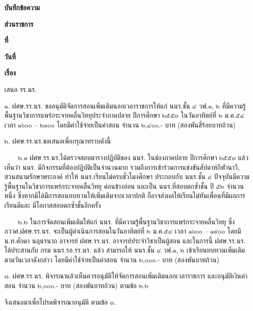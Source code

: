 \documentclass[a4paper, oneside]{article}
\begin{document}
	\begin{center}
		\begin{huge}
			\textbf{บันทึกข้อความ}
		\end{huge}	
	\end{center}
	\begin{large}
		\textbf{ส่วนราชการ}
	\end{large}
	\underline{}
	\newline
	\begin{large}
		\textbf{ที่}
	\end{large}
	\underline{}
	\begin{large}
		\textbf{วันที่}
	\end{large}
	\underline{}
	\newline
	\begin{large}
		\textbf{เรื่อง}
	\end{large}
	\underline{}

	\hskip -2.5cm
	เสนอ รร.นร.
	
	๑.  ฝศษ.รร.นร. ขออนุมัติจัดการสอนเพิ่มเติมนอกเวลาราชการให้แก่ นนร.ชั้น ๔ วฟ.๑,  ๒  ที่มีความรู้พื้นฐานวิชาการแพร่กระจายคลื่นวิทยุประจำภาคปลาย ปีการศึกษา ๒๕๕๓ ในวันอาทิตย์ที่ ๒ ม.ค.๕๔ เวลา ๑๖๐๐ – ๒๑๐๐ โดยมีค่าใช้จ่ายเป็นค่าสอน จำนวน ๒,๔๐๐.- บาท (สองพันสี่ร้อยบาทถ้วน)
	
	๒.  ฝศษ.รร.นร.ขอเสนอเพื่อกรุณาทราบดังนี้
	
	\vskip -6pt
	
	\ \ \ \ ๒.๑  ฝศษ.รร.นร.ได้ตรวจสอบตารางปฏิบัติของ นนร. ในช่องภาคปลาย ปีการศึกษา ๒๕๕๓ แล้ว เห็นว่า นนร. มีกิจกรรมที่ต้องปฏิบัติเป็นจำนวนมาก รวมถึงการเข้าร่วมการแข่งขันสัปดาห์กีฬานาวี,  สวนสนามรักษาพระองค์ ทำให้ นนร.เรียนไม่ครบชั่วโมงศึกษา ประกอบกับ นนร.ชั้น ๔  ปัจจุบันมีความรู้พื้นฐานในวิชาการแพร่กระจายคลื่นวิทยุ ค่อนข้างอ่อน และเป็น นนร.ที่สอบตกซ้ำชั้น ปี ๕๒ จำนวนหนึ่ง 
ซึ่งหากมิได้มีการสอนทบทวนให้เพิ่มเติมจากเวลาปกติ ก็อาจส่งผลให้เรียนไม่ทันเพื่อนที่มีผลการเรียนดีและ
มีโอกาสสอบตกซ้ำชั้นอีกครั้ง
	
	\vskip -6pt
	
	\ \ \ \ ๒.๒  ในการจัดสอนเพิ่มเติมให้แก่ นนร. ที่มีความรู้พื้นฐานวิชาการแพร่กระจายคลื่นวิทยุ ซึ่ง กววศ.ฝศษ.รร.นร. จะเป็นผู้ดำเนินการสอนในวันอาทิตย์ที่ ๒ ม.ค.๕๔  เวลา ๑๖๐๐ – ๑๙๐๐ โดยมี 
น.ท.ศักดา  นฤนรนาถ อาจารย์ ฝศษ.รร.นร. อาจารย์ประจำวิชาเป็นผู้สอน และในการนี้ ฝศษ.รร.นร. 
ได้ประสานกับ กรม นนร.รอ.รร.นร. แล้ว สามารถให้ นนร.ชั้น ๔ วฟ.๑,  ๒ เข้าเรียนทบทวนเพิ่มเติมตามวันเวลาดังกล่าว โดยมีค่าใช้จ่ายเป็นค่าสอน จำนวน ๒,๐๐๐.- บาท (สองพันบาทถ้วน)
	
	๓.  ฝศษ.รร.นร. พิจารณาแล้วเห็นควรอนุมัติให้จัดการสอนเพิ่มเติมนอกเวลาราชการ และอนุมัติเงินค่าสอน จำนวน ๒,๐๐๐.- บาท (สองพันบาทถ้วน) ตามข้อ ๒.๒
	
	จึงเสนอมาเพื่อโปรดพิจารณาอนุมัติ ตามข้อ ๓.
	\newline
	\newline
	\makebox[8.0cm][l]{}
	\newline
	\makebox[8.0cm][l]{}
\end{document}
